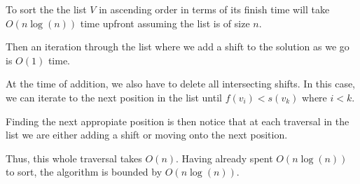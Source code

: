 \begin{soln}
	To sort the the list \(V\) in ascending order in terms of its finish time will take \(O(n\log(n))\) time upfront assuming the list is of size \(n\).

	Then an iteration through the list where we add a shift to the solution as we go is \(O(1)\) time.

	At the time of addition, we also have to delete all intersecting shifts. In this case, we can iterate to the next position in the list until \(f(v_i) < s(v_{k})\) where \(i < k\).

	Finding the next appropiate position is then notice that at each traversal in the list we are either adding a shift or moving onto the next position.

	Thus, this whole traversal takes \(O(n)\). Having already spent \(O(n\log(n))\) to sort, the algorithm is bounded by \(O(n\log(n))\).
\end{soln}













